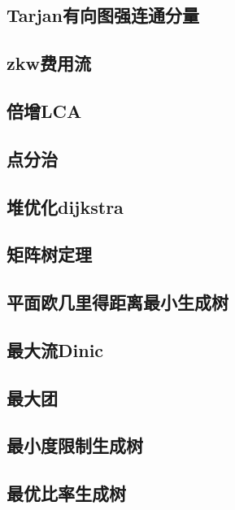 \documentclass[a4paper]{article}
\begin{document}
\subsection{Tarjan有向图强连通分量}

\subsection{zkw费用流}

\subsection{倍增LCA}

\subsection{点分治}

\subsection{堆优化dijkstra}

\subsection{矩阵树定理}

\subsection{平面欧几里得距离最小生成树}

\subsection{最大流Dinic}

\subsection{最大团}

\subsection{最小度限制生成树}

\subsection{最优比率生成树}

\end{document}

